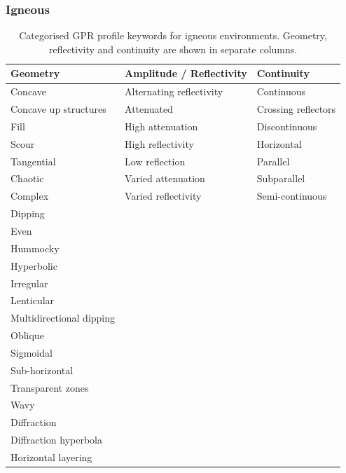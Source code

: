 \clearpage
\subsubsection{Igneous}
\begin{table}[h!]
\caption{Categorised GPR profile keywords for igneous environments. Geometry, reflectivity and continuity are shown in separate columns.}
\centering
\small
\begin{tabular}{|p{4.5cm}|p{4.5cm}|p{4.5cm}|}
\hline
\textbf{Geometry} & \textbf{Amplitude / Reflectivity} & \textbf{Continuity} \\
\hline
Concave & Alternating reflectivity & Continuous \\
Concave up structures & Attenuated & Crossing reflectors \\
Fill & High attenuation & Discontinuous \\
Scour & High reflectivity & Horizontal \\
Tangential & Low reflection & Parallel \\
Chaotic & Varied attenuation & Subparallel \\
Complex & Varied reflectivity & Semi-continuous \\
Dipping & & \\
Even & & \\
Hummocky & & \\
Hyperbolic & & \\
Irregular & & \\
Lenticular & & \\
Multidirectional dipping & & \\
Oblique & & \\
Sigmoidal & & \\
Sub-horizontal & & \\
Transparent zones & & \\
Wavy & & \\
Diffraction & & \\
Diffraction hyperbola & & \\
Horizontal layering & & \\
\hline
\end{tabular}
\label{tab:merged_gpr_keywords}
\end{table}

